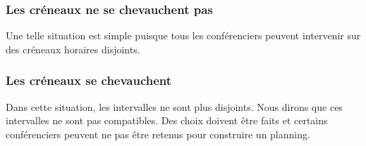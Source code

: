 \subsubsection{Les créneaux ne se chevauchent pas}

Une telle situation est simple puisque tous les conférenciers peuvent intervenir sur des créneaux horaires disjoints.

\subsubsection{Les créneaux se chevauchent}

Dans cette situation, les intervalles ne sont plus disjoints. Nous dirons que ces intervalles ne sont pas compatibles. Des choix doivent être faits et certains conférenciers peuvent ne pas être retenus pour construire un planning.







